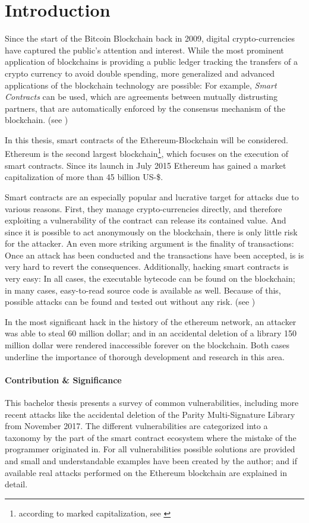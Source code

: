 \section{Introduction}
Since the start of the Bitcoin Blockchain back in 2009, digital crypto-currencies have captured the public's attention and interest. While the most prominent application of blockchains is providing a public ledger tracking the transfers of a crypto currency to avoid double spending, more generalized and advanced applications of the blockchain technology are possible: For example, \textit{Smart Contracts} can be used, which are agreements between mutually distrusting partners, that are automatically enforced by the consensus mechanism of the blockchain. (see \cite{atzei:attacksurvey})

In this thesis, smart contracts of the Ethereum-Blockchain will be considered. Ethereum is the second largest blockchain\footnote{according to marked capitalization, see \cite{coinmarketcap:overview}}, which focuses on the execution of smart contracts. Since its launch in July 2015 Ethereum has gained a market capitalization of more than 45 billion US-\$.

Smart contracts are an especially popular and lucrative target for attacks due to various reasons. First, they manage crypto-currencies directly, and therefore exploiting a vulnerability of the contract can release its contained value. And since it is possible to act anonymously on the blockchain, there is only little risk for the attacker. An even more striking argument is the finality of transactions: Once an attack has been conducted and the transactions have been accepted, is is very hard to revert the consequences. Additionally, hacking smart contracts is very easy: In all cases, the executable bytecode can be found on the blockchain; in many cases, easy-to-read source code is available as well. Because of this, possible attacks can be found and tested out without any risk. (see \cite{wagner:honeypots})

In the most significant hack in the history of the ethereum network, an attacker was able to steal 60 million dollar; and in an accidental deletion of a library 150 million dollar were rendered inaccessible forever on the blockchain. Both cases underline the importance of thorough development and research in this area.

\paragraph{Contribution \& Significance} This bachelor thesis presents a survey of common vulnerabilities, including more recent attacks like the accidental deletion of the Parity Multi-Signature Library from November 2017. The different vulnerabilities are categorized into a taxonomy by the part of the smart contract ecosystem where the mistake of the programmer originated in. For all vulnerabilities possible solutions are provided and small and understandable examples have been created by the author; and if available real attacks performed on the Ethereum blockchain are explained in detail.

